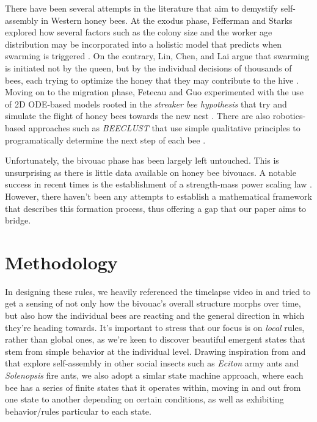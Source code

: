 \documentclass[a4paper,10pt]{article}
\begin{document}
\begin{multicols}{2}
    There have been several attempts in the literature that aim to demystify self-assembly in Western
    honey bees. At the exodus phase, Fefferman and Starks explored how several factors such as
    the colony size and the worker age distribution may be incorporated into a holistic model that predicts
    when swarming is triggered \cite{fefferman2006modeling}. On the contrary,  
    Lin, Chen, and Lai argue that swarming is initiated
    not by the queen, but by the individual decisions of thousands of bees, each trying to optimize
    the honey that they may contribute to the hive \cite{lin2003economics}.
    Moving on to the migration phase, Fetecau and Guo experimented with the use of 2D ODE-based models
    rooted in the \textit{streaker bee hypothesis} that try and simulate the flight of honey bees towards
    the new nest \cite{fetecau2012mathematical}. There are also robotics-based approaches such as \textit{BEECLUST}
    that use simple qualitative principles to programatically determine the next step of each bee
    \cite{schmickl2011beeclust}.

    Unfortunately, the bivouac phase has been largely left untouched. This is unsurprising as there is
    little data available on honey bee bivouacs. A notable success in recent times is the establishment
    of a strength-mass power scaling law \cite{shishkov2022strength}. However, there haven't been
    any attempts to establish a mathematical framework that describes this formation process, thus
    offering a gap that our paper aims to bridge.

    \section{Methodology}

    In designing these rules, we heavily referenced the timelapse video in
    \cite{peleg2018collective} and tried to get a sensing of not only how the bivouac's overall
    structure morphs over time, but also how the individual bees are reacting and the general
    direction in which they're heading towards. It's important to stress that our focus is on
    \textit{local} rules, rather than global ones, as we're keen to discover beautiful
    emergent states that stem from simple behavior at the individual level.
    Drawing inspiration from \cite{anderson2002self} and \cite{carlesso2023become} that explore self-assembly
    in other social insects such as \textit{Eciton} army ants and \textit{Solenopsis} fire ants, we also adopt
    a simlar state machine approach, where each bee has a series of finite states that it operates
    within, moving in and out from one state to another depending on certain conditions, as well as
    exhibiting behavior/rules particular to each state.


\end{multicols}
\end{document}
